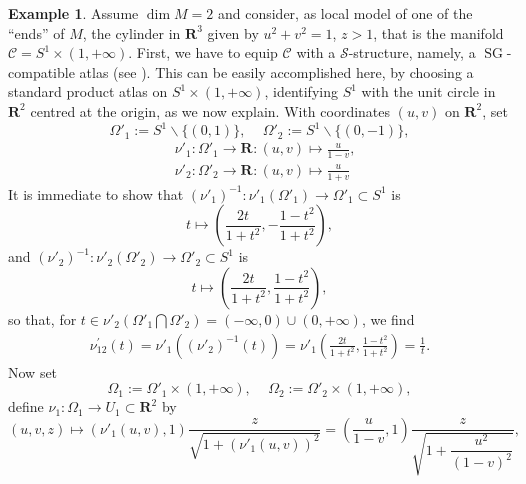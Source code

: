 \documentclass[12pt,a4paper,reqno]{amsart}
\numberwithin{equation}{section}
\numberwithin{thm}{section}
\theoremstyle{definition}
\newtheorem{example}[thm]{Example}
\theoremstyle{remark}
\begin{document}
\begin{example}\label{ex:hypmf}
Assume $\dim M=2$ and consider, as local model of one of the ``ends'' of $M$, the cylinder in ${\mathbf R^{{3}}}$
given by $u^2+v^2=1$, $z>1$, that is the manifold $\mathcal{C}=S^1\times(1,+\infty)$.
First, we have to equip ${\mathcal{C}}$ with a ${\mathscr{S}}$-structure, namely, a ${\operatorname{SG}}$-compatible atlas
(see \cite{Co, Sc}). This can be easily accomplished here, by choosing a standard product atlas
on $S^1\times(1,+\infty)$, identifying $S^1$ with the unit circle in ${\mathbf R^{{2}}}$ centred at the
origin, as we now explain. With coordinates $(u,v)$ on ${\mathbf R^{{2}}}$, set
\begin{equation*}
\Omega'_1 := S^1 \backslash \{(0,1)\}, \,\,\,\,\,\,\, \Omega'_2 := S^1 \backslash \{(0,-1)\},
\end{equation*}
\begin{align*}
&\nu'_1 : \Omega'_1  \rightarrow {\mathbf R^{{}}}\colon(u,v)  \mapsto \frac{u}{1-v},
\\
&\nu'_2 : \Omega'_2  \rightarrow {\mathbf R^{{}}}\colon(u,v) \mapsto \frac{u}{1+v}
\end{align*}
It is immediate to show that $(\nu'_1)^{-1} : \nu'_1(\Omega'_1)  \rightarrow  \Omega'_1 \subset S^1$ is
\begin{equation*}
t \mapsto \left(\frac{2t}{1+t^2}, -\frac{1-t^2}{1+t^2} \right),
\end{equation*}
and $(\nu'_2)^{-1} : \nu'_2(\Omega'_2)  \rightarrow  \Omega'_2 \subset S^1$ is
\begin{equation*}
t \mapsto \left(\frac{2t}{1+t^2}, \frac{1-t^2}{1+t^2} \right),
\end{equation*}
so that, for $\displaystyle t \in \nu'_2(\Omega'_1 \bigcap \Omega'_2)=(-\infty,0)\cup(0,+\infty)$, we find
\begin{equation*}
\begin{split}
\nu_{12}^\prime(t)  = \nu'_1((\nu'_2)^{-1}(t)) = \nu'_1 \left(\frac{2t}{1+t^2}, \frac{1-t^2}{1+t^2} \right) = \frac{1}{t}. 
\end{split}
\end{equation*}
Now set
\begin{equation*}
\Omega_1 := \Omega'_1 \times (1,+\infty), \,\,\,\,\,\,\, \Omega_2 := \Omega'_2 \times (1,+\infty),
\end{equation*}
define $\nu_1 : \Omega_1  \rightarrow  U_1 \subset {\mathbf R^{{2}}}$ by
\begin{equation*}
(u,v,z)  \mapsto (\nu'_1(u,v) , 1) \frac{z}{\sqrt{1 + (\nu'_1(u,v))^2}} = \left(\frac{u}{1-v} , 1\right) \frac{z}{\sqrt{1 + \dfrac{u^2}{(1-v)^2}}},

\end{equation*}
\end{example}
\end{document}
